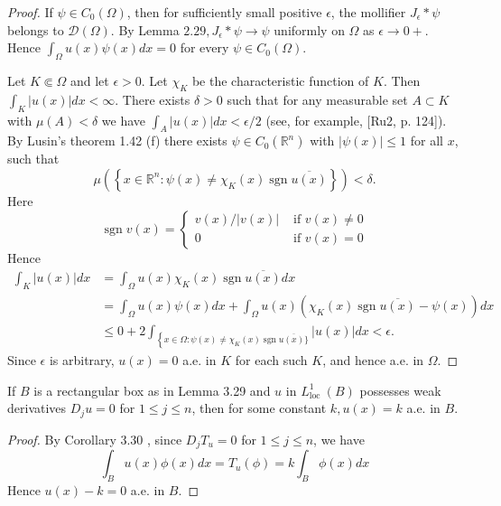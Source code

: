 \begin{proof}
  If $\psi \in C_0(\Omega)$, then for sufficiently small positive $\epsilon$, the mollifier $J_\epsilon * \psi$ belongs to $\mathscr{D}(\Omega)$. By Lemma $2.29, J_\epsilon * \psi \rightarrow \psi$ uniformly on $\Omega$ as $\epsilon \rightarrow 0+$. Hence $\int_{\Omega} u(x) \psi(x) d x=0$ for every $\psi \in C_0(\Omega)$.
  
  Let $K \Subset \Omega$ and let $\epsilon>0$. Let $\chi_K$ be the characteristic function of $K$. Then $\int_K|u(x)| d x<\infty$. There exists $\delta>0$ such that for any measurable set $A \subset K$ with $\mu(A)<\delta$ we have $\int_A|u(x)| d x<\epsilon / 2$ (see, for example, [Ru2, p. 124]). By Lusin's theorem 1.42 (f) there exists $\psi \in C_0\left(\mathbb{R}^n\right)$ with $|\psi(x)| \leq 1$ for all $x$, such that
  \[
  \mu\left(\left\{x \in \mathbb{R}^n: \psi(x) \neq \chi_K(x) \operatorname{sgn} \overline{u(x)}\right\}\right)<\delta .
  \]
  Here
  \[
  \operatorname{sgn} v(x)= \begin{cases}v(x) /|v(x)| & \text { if } v(x) \neq 0 \\ 0 & \text { if } v(x)=0\end{cases}
  \]
  Hence
  \[
  \begin{aligned}
  \int_K|u(x)| d x & =\int_{\Omega} u(x) \chi_K(x) \operatorname{sgn} \overline{u(x)} d x \\
  & =\int_{\Omega} u(x) \psi(x) d x+\int_{\Omega} u(x)\left(\chi_K(x) \operatorname{sgn} \overline{u(x)}-\psi(x)\right) d x \\
  & \leq 0+2 \int_{\left\{x \in \Omega: \psi(x) \neq \chi_K(x) \operatorname{sgn} \overline{u(x)\}}\right.}|u(x)| d x<\epsilon .
  \end{aligned}
  \]
  Since $\epsilon$ is arbitrary, $u(x)=0$ a.e. in $K$ for each such $K$, and hence a.e. in $\Omega$.
\end{proof}


\begin{corollary}
  If $B$ is a rectangular box as in Lemma 3.29 and $u$ in $L_{\text {loc }}^1(B)$ possesses weak derivatives $D_j u=0$ for $1 \leq j \leq n$, then for some constant $k, u(x)=k$ a.e. in $B$.
\end{corollary}

\begin{proof}
  By Corollary 3.30 , since $D_j T_u=0$ for $1 \leq j \leq n$, we have
  \[
  \int_B u(x) \phi(x) d x=T_u(\phi)=k \int_B \phi(x) d x
  \]
  Hence $u(x)-k=0$ a.e. in $B$.
\end{proof}


